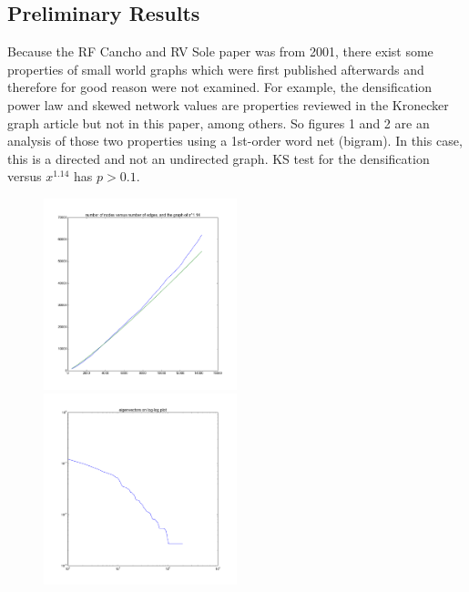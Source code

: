 \documentclass[12pt]{article}
\begin{document}
\subsection{Preliminary Results}

Because the RF Cancho and RV Sole paper was from 2001, there exist some properties of small world graphs which were first published afterwards and therefore for good reason were not examined. For example, the densification power law\cite{densificationpowerlaw} and skewed network values\cite{netvalskew} are properties reviewed in the Kronecker graph article but not in this paper, among others. So figures 1 and 2 are an analysis of those two properties using a 1st-order word net (bigram). In this case, this is a directed and not an undirected graph. KS test for the densification versus $x^{1.14}$ has $p>0.1$. %


\begin{figure}
  \includegraphics[width=0.5\textwidth]{densification_plot.png}
  \includegraphics[width=0.5\textwidth]{eigenvector_loglog.png}
\end{figure}
\end{document}

